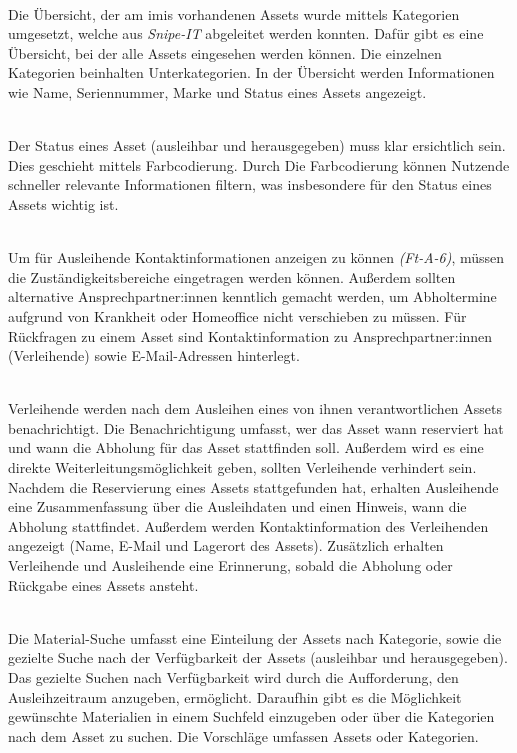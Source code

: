     {\sffamily\color{maincolor}{Ft-VA-2 | Übersicht über ausleihbare Assets }}\\
Die Übersicht, der am \ac{imis} vorhandenen Assets wurde mittels Kategorien
umgesetzt, welche aus \textit{Snipe-IT} abgeleitet werden konnten. Dafür gibt es
eine Übersicht, bei der alle Assets eingesehen werden können. Die einzelnen
Kategorien beinhalten Unterkategorien. In der Übersicht werden Informationen wie
Name, Seriennummer, Marke und Status eines Assets angezeigt.

    {\sffamily\color{maincolor}{Ft-VA-3 |  Verfügbarkeit von Assets }}\\
Der Status eines Asset (ausleihbar und herausgegeben) muss klar ersichtlich sein. Dies geschieht
mittels Farbcodierung. Durch Die Farbcodierung können Nutzende schneller relevante Informationen
filtern, was insbesondere für den Status eines Assets wichtig ist.


    {\sffamily\color{maincolor}{Ft-VA-4 | Zuständigkeitsbereich }}\\
Um für Ausleihende Kontaktinformationen anzeigen zu können \textit{(Ft-A-6)},
müssen die Zuständigkeitsbereiche eingetragen werden können. Außerdem sollten
alternative Ansprechpartner:innen kenntlich gemacht werden, um Abholtermine
aufgrund von Krankheit oder Homeoffice nicht verschieben zu müssen. Für
Rückfragen zu einem Asset sind Kontaktinformation zu Ansprechpartner:innen
(Verleihende) sowie E-Mail-Adressen hinterlegt.

    {\sffamily\color{maincolor}{Ft-VA-5 | Benachrichtigungen \& Erinnerungen
        }}\\
Verleihende werden nach dem Ausleihen eines von ihnen verantwortlichen Assets benachrichtigt. Die
Benachrichtigung umfasst, wer das Asset wann reserviert hat und wann die Abholung für das Asset
stattfinden soll. Außerdem wird es eine direkte Weiterleitungsmöglichkeit geben, sollten Verleihende
verhindert sein. Nachdem die Reservierung eines Assets stattgefunden hat, erhalten Ausleihende eine
Zusammenfassung über die Ausleihdaten und einen Hinweis, wann die Abholung stattfindet. Außerdem
werden Kontaktinformation des Verleihenden angezeigt (Name, E-Mail und Lagerort des Assets).
Zusätzlich erhalten Verleihende und Ausleihende eine Erinnerung, sobald die Abholung oder Rückgabe
eines Assets ansteht.

    {\sffamily\color{maincolor}{Ft-VA-6 | Material-Suche }}\\
Die Material-Suche umfasst eine Einteilung der Assets nach Kategorie, sowie die gezielte Suche nach
der Verfügbarkeit der Assets (ausleihbar und herausgegeben). Das gezielte Suchen nach Verfügbarkeit
wird durch die Aufforderung, den Ausleihzeitraum anzugeben, ermöglicht. Daraufhin gibt es die
Möglichkeit gewünschte Materialien in einem Suchfeld einzugeben oder über die Kategorien nach dem
Asset zu suchen. Die Vorschläge umfassen Assets oder Kategorien.

